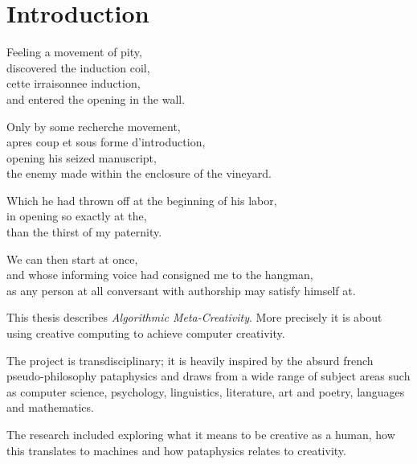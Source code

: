 
\chapter{Introduction}
\label{ch:introduction}

\startcontents[chapters]

\vfill

Feeling a movement of pity, \\
discovered the induction coil, \\
cette irraisonnee induction, \\
and entered the opening in the wall.

Only by some recherche movement, \\
apres coup et sous forme d'introduction, \\
opening his seized manuscript, \\
the enemy made within the enclosure of the vineyard.

Which he had thrown off at the beginning of his labor, \\
in opening so exactly at the, \\
than the thirst of my paternity.

We can then start at once, \\
and whose informing voice had consigned me to the hangman, \\
as any person at all conversant with authorship may satisfy himself at.

\newpage
\minicontents
\spirals

This thesis describes \emph{Algorithmic Meta-Creativity}. More precisely it is about using creative computing to achieve computer creativity.

The project is transdisciplinary; it is heavily inspired by the absurd french pseudo-philosophy pataphysics and draws from a wide range of subject areas such as computer science, psychology, linguistics, literature, art and poetry, languages and mathematics.

The research included exploring what it means to be creative as a human, how this translates to machines and how pataphysics relates to creativity.

\begin{draft}
  
\end{draft}

